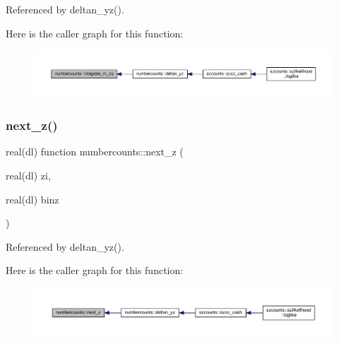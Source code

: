 Referenced by deltan\+\_\+yz().

Here is the caller graph for this function\+:
\nopagebreak
\begin{figure}[H]
\begin{center}
\leavevmode
\includegraphics[width=350pt]{namespacenumbercounts_ab1013e4cf6773ad5eef3b128285b1dff_icgraph}
\end{center}
\end{figure}
\mbox{\label{namespacenumbercounts_a9dd53df8344f5ed34b320cf13cd342b6}} 
\subsubsection{\texorpdfstring{next\+\_\+z()}{next\_z()}}
{\footnotesize\ttfamily real(dl) function numbercounts\+::next\+\_\+z (\begin{DoxyParamCaption}\item[{real(dl)}]{zi,  }\item[{real(dl)}]{binz }\end{DoxyParamCaption})}



Referenced by deltan\+\_\+yz().

Here is the caller graph for this function\+:
\nopagebreak
\begin{figure}[H]
\begin{center}
\leavevmode
\includegraphics[width=350pt]{namespacenumbercounts_a9dd53df8344f5ed34b320cf13cd342b6_icgraph}
\end{center}
\end{figure}
